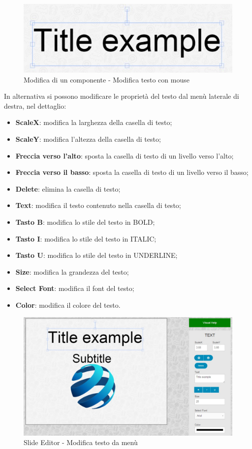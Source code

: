 \begin{figure}[H] 
	\centering 
	\includegraphics[scale=0.80] {img/text_anchor}
	\caption{Modifica di un componente - Modifica testo con mouse} 
\end{figure}

\noindent In alternativa si possono modificare le proprietà del testo dal menù laterale di destra, nel dettaglio:
		
		\begin{itemize}
			\item \textbf{ScaleX}: modifica la larghezza della casella di testo;
			\item \textbf{ScaleY}: modifica l'altezza della casella di testo;
			\item \textbf{Freccia verso l'alto}: sposta la casella di testo di un livello verso l'alto;
			\item \textbf{Freccia verso il basso}: sposta la casella di testo di un livello verso il basso;
			\item \textbf{Delete}: elimina la casella di testo;
			\item \textbf{Text}: modifica il testo contenuto nella casella di testo;
			\item \textbf{Tasto B}: modifica lo stile del testo in BOLD;
			\item \textbf{Tasto I}: modifica lo stile del testo in ITALIC;
			\item \textbf{Tasto U}: modifica lo stile del testo in UNDERLINE;
			\item \textbf{Size}: modifica la grandezza del testo;
			\item \textbf{Select Font}: modifica il font del testo;
			\item \textbf{Color}: modifica il colore del testo.
		\end{itemize}
		 \begin{figure}[h] 
		    \centering 
		    \includegraphics[scale=0.40] {img/text_edit}
		    \caption{Slide Editor - Modifica testo da menù} 
		\end{figure}
		
